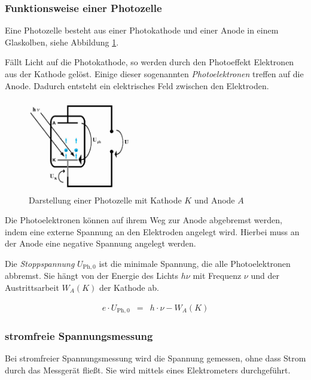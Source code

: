 \documentclass[12pt,a4paper]{scrartcl}
\numberwithin{equation}{section} %
\begin{document}
\subsubsection{Funktionsweise einer Photozelle}
Eine Photozelle besteht aus einer Photokathode und einer Anode in einem Glaskolben, siehe Abbildung \ref{fig:photozelle}.

Fällt Licht auf die Photokathode, so werden durch den Photoeffekt Elektronen aus der Kathode gelöst. Einige dieser sogenannten \textit{Photoelektronen} treffen auf die Anode. Dadurch entsteht ein elektrisches Feld zwischen den Elektroden.

\begin{figure}[h]
	\centering
	\includegraphics[width=0.4\textwidth]{../media/B1.4/Photozelle.jpg}
	\caption{Darstellung einer Photozelle mit Kathode $K$ und Anode $A$ \cite{uni}}
	\label{fig:photozelle}
\end{figure}

Die Photoelektronen können auf ihrem Weg zur Anode abgebremst werden, indem eine externe Spannung an den Elektroden angelegt wird. Hierbei muss an der Anode eine negative Spannung angelegt werden.

Die \textit{Stoppspannung} $U_{\mathrm{Ph}, 0}$ ist die minimale Spannung, die alle Photoelektronen abbremst. Sie hängt von der Energie des Lichts $h\nu$ mit Frequenz $\nu$ und der Austrittsarbeit $W_A(K)$ der Kathode ab. \cite{Gerthsen}

\begin{eqnarray}
	e \cdot U_{\mathrm{Ph}, 0} &=& h \cdot \nu - W_A (K) \label{eq:Stoppspannung Geradengleichung}
\end{eqnarray}

\subsubsection{stromfreie Spannungsmessung}
Bei stromfreier Spannungsmessung wird die Spannung gemessen, ohne dass Strom durch das Messgerät fließt. Sie wird mittels eines Elektrometers durchgeführt.
\end{document}
